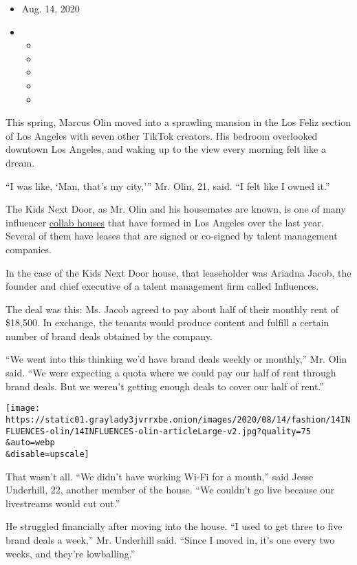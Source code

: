 \begin{itemize}
\item
  Aug. 14, 2020
\item
  \begin{itemize}
  \item
  \item
  \item
  \item
  \item
  \end{itemize}
\end{itemize}

This spring, Marcus Olin moved into a sprawling mansion in the Los Feliz
section of Los Angeles with seven other TikTok creators. His bedroom
overlooked downtown Los Angeles, and waking up to the view every morning
felt like a dream.

``I was like, `Man, that's my city,''' Mr. Olin, 21, said. ``I felt like
I owned it.''

The Kids Next Door, as Mr. Olin and his housemates are known, is one of
many influencer
\href{https://www.nytimes3xbfgragh.onion/2020/01/03/style/hype-house-los-angeles-tik-tok.html}{collab
houses} that have formed in Los Angeles over the last year. Several of
them have leases that are signed or co-signed by talent management
companies.

In the case of the Kids Next Door house, that leaseholder was Ariadna
Jacob, the founder and chief executive of a talent management firm
called Influences.

The deal was this: Ms. Jacob agreed to pay about half of their monthly
rent of \$18,500. In exchange, the tenants would produce content and
fulfill a certain number of brand deals obtained by the company.

``We went into this thinking we'd have brand deals weekly or monthly,''
Mr. Olin said. ``We were expecting a quota where we could pay our half
of rent through brand deals. But we weren't getting enough deals to
cover our half of rent.''

\texttt{[image: https://static01.graylady3jvrrxbe.onion/images/2020/08/14/fashion/14INFLUENCES-olin/14INFLUENCES-olin-articleLarge-v2.jpg?quality=75\\\&auto=webp\\\&disable=upscale]}

That wasn't all. ``We didn't have working Wi-Fi for a month,'' said
Jesse Underhill, 22, another member of the house. ``We couldn't go live
because our livestreams would cut out.''

He struggled financially after moving into the house. ``I used to get
three to five brand deals a week,'' Mr. Underhill said. ``Since I moved
in, it's one every two weeks, and they're lowballing.''

